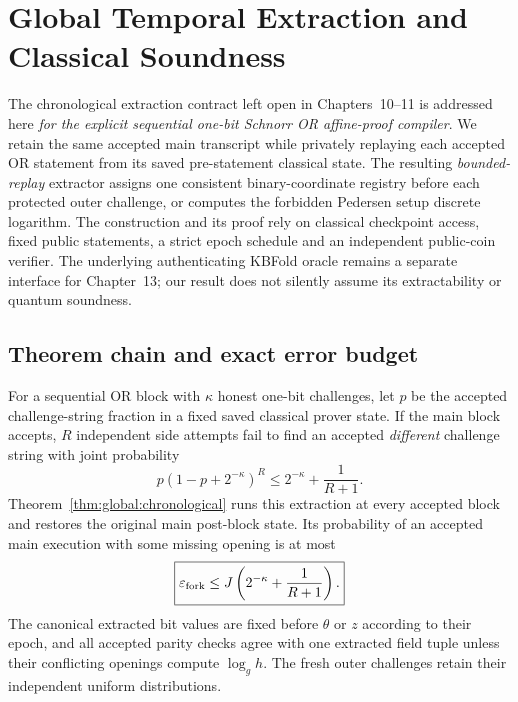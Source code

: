 \section{Global Temporal Extraction and Classical Soundness}\label{sec:global}
The chronological extraction contract left open in
Chapters~10--11 is addressed here \emph{for the explicit
sequential one-bit Schnorr OR affine-proof compiler}.
We retain the same accepted main transcript while
privately replaying each accepted OR statement from
its saved pre-statement classical state.
The resulting \emph{bounded-replay} extractor
assigns one consistent binary-coordinate
registry before each protected outer challenge,
or computes the forbidden Pedersen setup
discrete logarithm.
The construction and its proof rely on
classical checkpoint access, fixed public
statements, a strict epoch schedule and an
independent public-coin verifier.
The underlying authenticating KBFold oracle
remains a separate interface for Chapter~13;
our result does not silently assume its
extractability or quantum soundness.







\subsection{Theorem chain and exact error budget}\label{sec:global:conclusion}
For a sequential OR block with $\kappa$
honest one-bit challenges, let
$p$ be the accepted challenge-string
fraction in a fixed saved classical
prover state. If the main block
accepts, $R$ independent side
attempts fail to find an accepted
\emph{different} challenge string
with joint probability
\[
 \boxed{p(1-p+2^{-\kappa})^R
 \le 2^{-\kappa}+\frac1{R+1}.}
\]
Theorem~\ref{thm:global:chronological}
runs this extraction at every accepted
block and restores the original main
post-block state. Its probability of
an accepted main execution with
some missing opening is at most
\[
 \boxed{\varepsilon_{\rm fork}\le
 J\left(2^{-\kappa}+\frac1{R+1}\right).}
\]
The canonical extracted bit values
are fixed before $\theta$ or $z$
according to their epoch, and all
accepted parity checks agree with one
extracted field tuple unless their
conflicting openings compute
$\log_g h$. The fresh outer
challenges retain their independent
uniform distributions.

